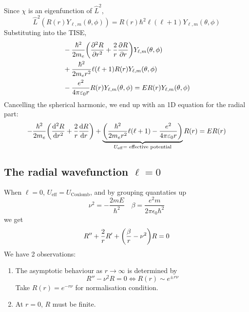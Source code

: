 \documentclass[a4paper]{article}
\begin{document}
Since \( \chi \) is an eigenfunction of \( \hat L^2 \),
\[
	\hat L^2 (R(r) Y_{\ell,m}(\theta,\phi)) = R(r) \hbar^2 \ell (\ell+1)Y_{\ell,m}(\theta, \phi)
\]
Substituting into the TISE,
\begin{align*}
	&-\frac{\hbar^2}{2m_e} \qty( \pdv[2]{R}{r} 
	+ \frac{2}{r} \pdv{R}{r} ) Y_{\ell,m}(\theta, \phi) \\ 
	&+ \frac{\hbar^2}{2 m_e r^2} \ell(\ell+1) R(r)Y_{\ell,m}(\theta, \phi) \\ 
	&-\frac{e^2}{4 \pi \varepsilon_0 r} R(r)Y_{\ell,m}(\theta,\phi) = E R(r)Y_{\ell,m}(\theta,\phi)
\end{align*}
Cancelling the spherical harmonic, we end up with an 1D equation for the radial part:
\[
	-\frac{\hbar^2}{2m_e} \qty( \dv[2]{R}{r} + \frac{2}{r} \dv{R}{r} ) + \underbrace{\qty(\frac{\hbar^2}{2 m_e r^2} \ell(\ell+1) - \frac{e^2}{4 \pi \varepsilon_0 r})}_{U_{\mathrm{eff}} = \text{ effective potential}} R(r) = E R(r)
\]
\subsection{The radial wavefunction $ \ell=0 $}

When $ \ell=0 $, $ U_{\text{eff}} = U_{\text{Coulomb}} $, and by grouping quantaties up
\[
	\nu^2 = - \frac{2m E}{\hbar^2} \quad \beta = \frac{e^2m}{2\pi\epsilon_0 \hbar^2}
\]
we get
\[
	R'' + \frac{2}{r} R' + \qty(\frac{\beta}{r} - \nu^2 )R = 0
\]
We have 2 observations:
\begin{enumerate}
	\item The asymptotic behaviour as $ r\to \infty $ is determined by 
	\[
		R'' - \nu^2 R = 0 \iff R(r) \sim e^{\pm r \nu}
	\]
	Take $ R(r) = e^{-r\nu} $ for normalisation condition. 
	\item At $r=0$, $R$ must be finite. 
\end{enumerate}
\end{document}
